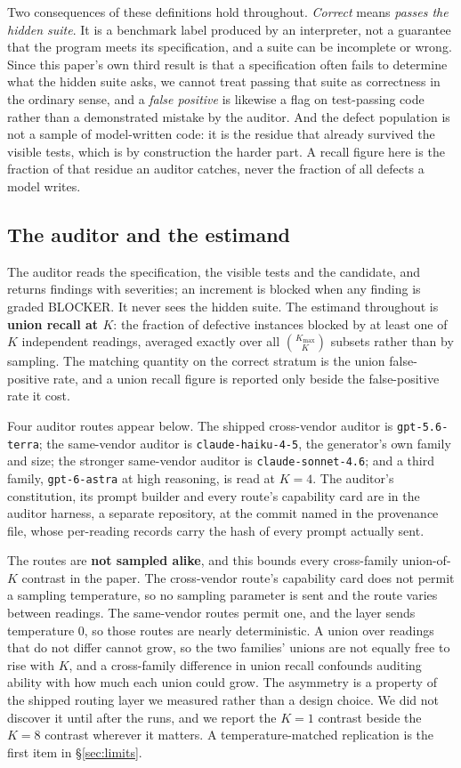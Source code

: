 Two consequences of these definitions hold throughout. \emph{Correct} means \emph{passes the
hidden suite}. It is a benchmark label produced by an interpreter, not a guarantee that the
program meets its specification, and a suite can be incomplete or wrong. Since this paper's own
third result is that a specification often fails to determine what the hidden suite asks, we
cannot treat passing that suite as correctness in the ordinary sense, and a \emph{false positive}
is likewise a flag on test-passing code rather than a demonstrated mistake by the auditor. And the
defect population is not a sample of model-written code: it is the residue that already survived
the visible tests, which is by construction the harder part. A recall figure here is the fraction
of that residue an auditor catches, never the fraction of all defects a model writes.

\subsection{The auditor and the estimand}

The auditor reads the specification, the visible tests and the candidate, and returns findings
with severities; an increment is blocked when any finding is graded BLOCKER. It never sees the
hidden suite. The estimand throughout is \textbf{union recall at $K$}: the fraction of defective
instances blocked by at least one of $K$ independent readings, averaged exactly over all
$\binom{K_{\max}}{K}$ subsets rather than by sampling. The matching quantity on the correct stratum
is the union false-positive rate, and a union recall figure is reported only beside the
false-positive rate it cost.

Four auditor routes appear below. The shipped cross-vendor auditor is \texttt{gpt-5.6-terra}; the
same-vendor auditor is \texttt{claude-haiku-4-5}, the generator's own family and size; the
stronger same-vendor auditor is \texttt{claude-sonnet-4.6}; and a third family,
\texttt{gpt-6-astra} at high reasoning, is read at $K=4$. The auditor's constitution, its prompt
builder and every route's capability card are in the auditor harness, a separate repository, at
the commit named in the provenance file, whose per-reading records carry the hash of every prompt
actually sent.

The routes are \textbf{not sampled alike}, and this bounds every cross-family union-of-$K$
contrast in the paper. The cross-vendor route's capability card does not permit a sampling
temperature, so no sampling parameter is sent and the route varies between readings. The
same-vendor routes permit one, and the layer sends temperature $0$, so those routes are nearly
deterministic. A union over readings that do not differ cannot grow, so the two families' unions
are not equally free to rise with $K$, and a cross-family difference in union recall confounds
auditing ability with how much each union could grow. The asymmetry is a property of the shipped
routing layer we measured rather than a design choice. We did not discover it until after the
runs, and we report the $K=1$ contrast beside the $K=8$ contrast wherever it matters. A
temperature-matched replication is the first item in \S\ref{sec:limits}.

